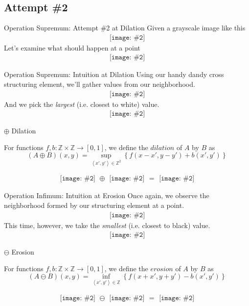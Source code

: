 \documentclass{beamer}
\newcommand{\pic}[2]{
     \begin{array}{l}
      \texttt{[image: \#2]}
      \end{array}
}
\newcommand{\set}[1]{\left\lbrace #1 \right\rbrace}
\newcommand{\tuple}[1]{\left\langle #1 \right\rangle}
\newcommand{\integers}{\mathbb{Z}}
\newcommand{\dilate}{\oplus}
\newcommand{\erode}{\ominus}
\begin{document}
\subsection{Attempt \#2}

\begin{frame}{Operation Supremum: Attempt \#2 at Dilation}
  Given a grayscale image like this
  $$\pic{width=50pt}{images/grayscale_tiles.png}$$  
  Let's examine what should happen at a point
  $$\pic{width=50pt}{images/grayscale_tiles_point.png}$$
\end{frame}

\begin{frame}{Operation Supremum: Intuition at Dilation}
  Using our handy dandy cross structuring element, we'll gather values from
  our neighborhood.
  $$\pic{width=50pt}{images/grayscale_tiles_neighborhood.png}$$  
  And we pick the \emph{largest} (i.e. closest to white) value.
  $$\pic{width=50pt}{images/grayscale_tiles_point_replacement.png}$$
\end{frame}

\begin{frame}{$\dilate$ Dilation}
\begin{definition}
  For functions $f,b: \mathbb{Z}\times\mathbb{Z}\rightarrow [0,1]$,
  we define the $dilation$ of $A$ by $B$ as
  $$(A \dilate B)(x,y) = \displaystyle\sup_{\tuple{x',y'} \in \integers^2}
                                      \set{f(x-x',y-y') + b(x',y')}$$
\end{definition}
  $$\pic{width=50pt}{images/grayscale_tiles.png}
    \dilate \pic{width=50pt}{images/cross_inverted.png}
     = \pic{width=50pt}{images/grayscale_tiles_dilated.png}$$
\end{frame}

\begin{frame}{Operation Infimum: Intuition at Erosion}
  Once again, we observe the neighborhood formed by our structuring element
  at a point.
  $$\pic{width=50pt}{images/grayscale_tiles_neighborhood2.png}$$
  This time, however, we take the \emph{smallest} (i.e. closest to black)
  value.
  $$\pic{width=50pt}{images/grayscale_tiles_point_replacement2.png}$$
\end{frame}

\begin{frame}{$\erode$ Erosion}
\begin{definition}
  For functions $f,b: \mathbb{Z}\times\mathbb{Z}\rightarrow [0,1]$,
  we define the $erosion$ of $A$ by $B$ as
  $$(A \erode B)(x,y) = \displaystyle\inf_{\tuple{x',y'} \in \mathbb{Z}}
                                      \set{f(x+x',y+y') - b(x',y')}$$
\end{definition}
$$\pic{width=50pt}{images/grayscale_tiles.png}
  \erode \pic{width=50pt}{images/cross_inverted.png}
  = \pic{width=50pt}{images/grayscale_tiles_eroded.png}$$
\end{frame}
\end{document}
